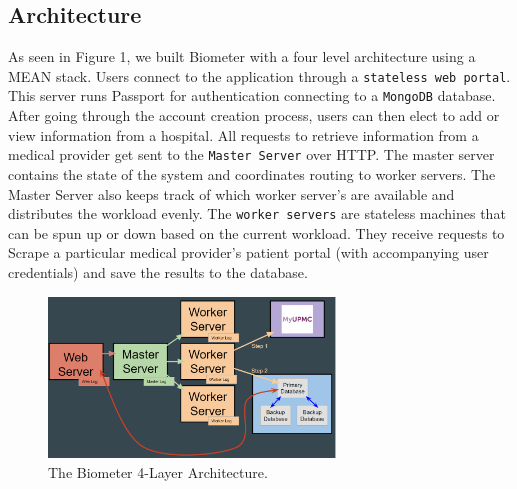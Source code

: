 \documentclass{sig-alternate-nocopyright}
\begin{document}
\subsection{Architecture}
As seen in Figure 1, we built Biometer with a four level architecture using a MEAN stack. Users connect to the application through a \texttt{stateless web portal}. This server runs Passport for authentication connecting to a \texttt{MongoDB} database. After going through the account creation process, users can then elect to add or view information from a hospital. All requests to retrieve information from a medical provider get sent to the \texttt{Master Server} over HTTP. The master server contains the state of the system and coordinates routing to worker servers. The Master Server also keeps track of which worker server's are available and distributes the workload evenly. The \texttt{worker servers} are stateless machines that can be spun up or down based on the current workload. They receive requests to Scrape a particular medical provider's patient portal (with accompanying user credentials) and save the results to the database.
\begin{figure}
\includegraphics[width=3in]{architecture}
\caption{The Biometer 4-Layer Architecture.}
\end{figure} 
\end{document}
